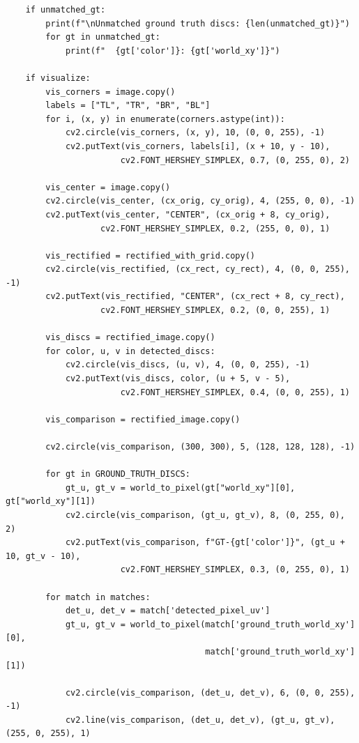\documentclass{article}
\begin{document}
\begin{latin}
\begin{LTR}
\begin{verbatim}
    if unmatched_gt:
        print(f"\nUnmatched ground truth discs: {len(unmatched_gt)}")
        for gt in unmatched_gt:
            print(f"  {gt['color']}: {gt['world_xy']}")
    
    if visualize:
        vis_corners = image.copy()
        labels = ["TL", "TR", "BR", "BL"]
        for i, (x, y) in enumerate(corners.astype(int)):
            cv2.circle(vis_corners, (x, y), 10, (0, 0, 255), -1)
            cv2.putText(vis_corners, labels[i], (x + 10, y - 10),
                       cv2.FONT_HERSHEY_SIMPLEX, 0.7, (0, 255, 0), 2)
        
        vis_center = image.copy()
        cv2.circle(vis_center, (cx_orig, cy_orig), 4, (255, 0, 0), -1)
        cv2.putText(vis_center, "CENTER", (cx_orig + 8, cy_orig),
                   cv2.FONT_HERSHEY_SIMPLEX, 0.2, (255, 0, 0), 1)
        
        vis_rectified = rectified_with_grid.copy()
        cv2.circle(vis_rectified, (cx_rect, cy_rect), 4, (0, 0, 255), -1)
        cv2.putText(vis_rectified, "CENTER", (cx_rect + 8, cy_rect),
                   cv2.FONT_HERSHEY_SIMPLEX, 0.2, (0, 0, 255), 1)
        
        vis_discs = rectified_image.copy()
        for color, u, v in detected_discs:
            cv2.circle(vis_discs, (u, v), 4, (0, 0, 255), -1)
            cv2.putText(vis_discs, color, (u + 5, v - 5),
                       cv2.FONT_HERSHEY_SIMPLEX, 0.4, (0, 0, 255), 1)
        
        vis_comparison = rectified_image.copy()
        
        cv2.circle(vis_comparison, (300, 300), 5, (128, 128, 128), -1)
        
        for gt in GROUND_TRUTH_DISCS:
            gt_u, gt_v = world_to_pixel(gt["world_xy"][0], gt["world_xy"][1])
            cv2.circle(vis_comparison, (gt_u, gt_v), 8, (0, 255, 0), 2)
            cv2.putText(vis_comparison, f"GT-{gt['color']}", (gt_u + 10, gt_v - 10),
                       cv2.FONT_HERSHEY_SIMPLEX, 0.3, (0, 255, 0), 1)
        
        for match in matches:
            det_u, det_v = match['detected_pixel_uv']
            gt_u, gt_v = world_to_pixel(match['ground_truth_world_xy'][0], 
                                        match['ground_truth_world_xy'][1])
            
            cv2.circle(vis_comparison, (det_u, det_v), 6, (0, 0, 255), -1)
            cv2.line(vis_comparison, (det_u, det_v), (gt_u, gt_v), (255, 0, 255), 1)
            

\end{verbatim}
\end{LTR}
\end{latin}
\end{document}
